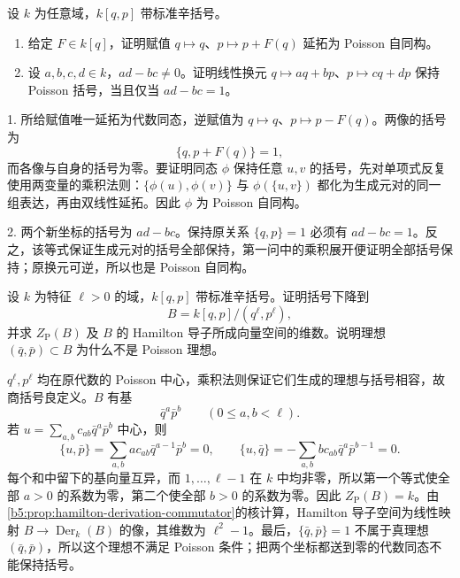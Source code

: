 \begin{exercise}\label{b5:ex:15-poisson-coordinate-changes}
	设 \(k\) 为任意域，\(k[q,p]\) 带标准辛括号。
	\begin{enumerate}
		\item 给定 \(F\in k[q]\)，证明赋值 \(q\mapsto q\)、\(p\mapsto p+F(q)\) 延拓为 Poisson 自同构。
		\item 设 \(a,b,c,d\in k\)，\(ad-bc\ne0\)。证明线性换元 \(q\mapsto aq+bp\)、\(p\mapsto cq+dp\) 保持 Poisson 括号，当且仅当 \(ad-bc=1\)。
	\end{enumerate}
\end{exercise}
\begin{solution}
	1. 所给赋值唯一延拓为代数同态，逆赋值为 \(q\mapsto q\)、\(p\mapsto p-F(q)\)。两像的括号为
	\[
		\{q,p+F(q)\}=1,
	\]
	而各像与自身的括号为零。要证明同态 \(\phi\) 保持任意 \(u,v\) 的括号，先对单项式反复使用两变量的乘积法则：\(\{\phi(u),\phi(v)\}\) 与 \(\phi(\{u,v\})\) 都化为生成元对的同一组表达，再由双线性延拓。因此 \(\phi\) 为 Poisson 自同构。

	2. 两个新坐标的括号为 \(ad-bc\)。保持原关系 \(\{q,p\}=1\) 必须有 \(ad-bc=1\)。反之，该等式保证生成元对的括号全部保持，第一问中的乘积展开便证明全部括号保持；原换元可逆，所以也是 Poisson 自同构。
\end{solution}

\begin{exercise}\label{b5:ex:15-truncated-symplectic-algebra}
	设 \(k\) 为特征 \(\ell>0\) 的域，\(k[q,p]\) 带标准辛括号。证明括号下降到
	\[
		B=k[q,p]/(q^\ell,p^\ell),
	\]
	并求 \(Z_{\mathrm P}(B)\) 及 \(B\) 的 Hamilton 导子所成向量空间的维数。说明理想 \((\bar q,\bar p)\subset B\) 为什么不是 Poisson 理想。
\end{exercise}
\begin{solution}
	\(q^\ell,p^\ell\) 均在原代数的 Poisson 中心，乘积法则保证它们生成的理想与括号相容，故商括号良定义。\(B\) 有基
	\[
		\bar q^a\bar p^b\qquad(0\le a,b<\ell).
	\]
	若 \(u=\sum_{a,b}c_{ab}\bar q^a\bar p^b\) 中心，则
	\[
		\{u,\bar p\}=\sum_{a,b}a c_{ab}\bar q^{a-1}\bar p^b=0,
		\qquad
		\{u,\bar q\}=-\sum_{a,b}b c_{ab}\bar q^a\bar p^{b-1}=0.
	\]
	每个和中留下的基向量互异，而 \(1,\ldots,\ell-1\) 在 \(k\) 中均非零，所以第一个等式使全部 \(a>0\) 的系数为零，第二个使全部 \(b>0\) 的系数为零。因此 \(Z_{\mathrm P}(B)=k\)。由\cref{b5:prop:hamilton-derivation-commutator}的核计算，Hamilton 导子空间为线性映射 \(B\to\operatorname{Der}_k(B)\) 的像，其维数为 \(\ell^2-1\)。最后，\(\{\bar q,\bar p\}=1\) 不属于真理想 \((\bar q,\bar p)\)，所以这个理想不满足 Poisson 条件；把两个坐标都送到零的代数同态不能保持括号。
\end{solution}

